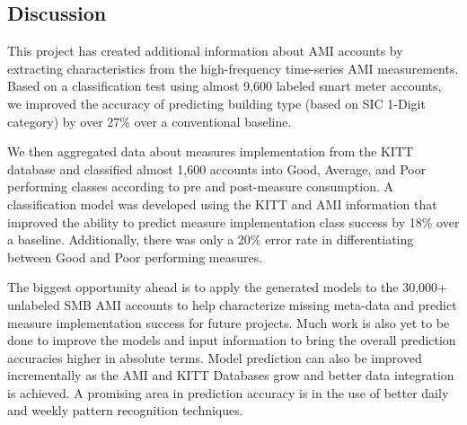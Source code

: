 \subsection{Discussion}
\label{sec:scalabilitydiscussion}

This project has created additional information about AMI accounts by extracting characteristics from the high-frequency time-series AMI measurements. Based on a classification test using almost 9,600 labeled smart meter accounts, we improved the accuracy of predicting building type (based on SIC 1-Digit category) by over 27\% over a conventional baseline. 

We then aggregated data about measures implementation from the KITT database and classified almost 1,600 accounts into Good, Average, and Poor performing classes according to pre and post-measure consumption. A classification model was developed using the KITT and AMI information that improved the ability to predict measure implementation class success by 18\% over a baseline. Additionally, there was only a 20\% error rate in differentiating between Good and Poor performing measures.

The biggest opportunity ahead is to apply the generated models to the 30,000+ unlabeled SMB AMI accounts to help characterize missing meta-data and predict measure implementation success for future projects. Much work is also yet to be done to improve the models and input information to bring the overall prediction accuracies higher in absolute terms. Model prediction can also be improved incrementally as the AMI and KITT Databases grow and better data integration is achieved. A promising area in prediction accuracy is in the use of better daily and weekly pattern recognition techniques.

